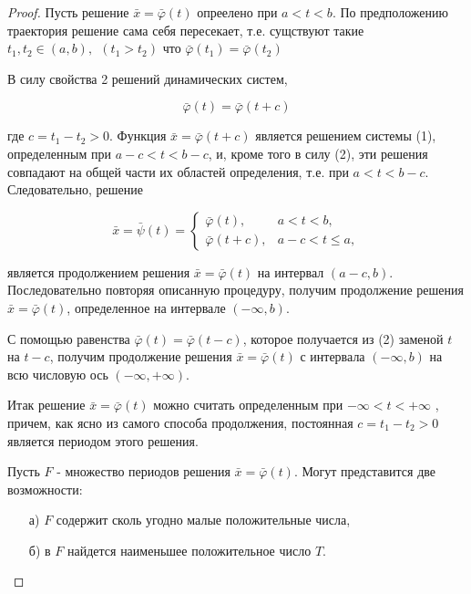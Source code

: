 \documentclass{article}
\theoremstyle{definition} \newtheorem*{theorem*}{Теорема}
\theoremstyle{plain} \newtheorem{theorem}{Теорема}[section]
\theoremstyle{definition} \newtheorem*{corollary*}{Следствие}
\theoremstyle{definition} \newtheorem{corollary}{Следствие}[section]
\begin{document}
\begin{proof}
    Пусть решение $\bar{x} = \bar{\varphi}(t)$ опреелено при $a < t < b$.
    По предположению траектория решение сама себя пересекает,
    т.е. сущствуют такие
    $t_1,t_2 \in (a,b) ,\ \ (t_1 > t_2)$ что
    $\bar{\varphi}(t_1) = \bar{\varphi}(t_2)$

    В силу свойства 2 решений динамических систем,

    \begin{equation}
        \bar{\varphi}(t) = \bar{\varphi}(t + c)
    \end{equation}

    где $c = t_1 - t_2 > 0$.
    Функция $\bar{x} = \bar{\varphi}(t+c)$ является решением системы (1),
    определенным при $a-c < t < b-c$, и, кроме того в силу (2),
    эти решения совпадают на общей части их областей определения,
    т.е. при $a < t < b-c$. Следовательно, решение

    \begin{equation}
        \bar{x} = \bar{\psi}(t) =
        \begin{cases}
            \bar{\varphi}(t), &a < t < b,\\
            \bar{\varphi}(t + c), & a-c < t \le a,
        \end{cases}
    \end{equation}

    является продолжением решения $\bar{x} = \bar{\varphi}(t)$
    на интервал $(a-c, b)$.
    Последовательно повторяя описанную процедуру,
    получим продолжение
    решения $\bar{x} = \bar{\varphi}(t)$, определенное
    на интервале $(- \infty, b)$.

    С помощью равенства $\bar{\varphi}(t)
    = \bar{\varphi}(t - c)$, которое
    получается из (2) заменой $t$ на $t - c$, получим продолжение
    решения $\bar{x} = \bar{\varphi}(t)$ с интервала
    $(- \infty, b)$ на всю числовую ось $(-\infty, +\infty)$.

    Итак решение $\bar{x} = \bar{\varphi}(t)$  можно считать
    определенным при $- \infty < t < + \infty$ , причем,
    как ясно из самого способа продолжения, постоянная
    $c = t_1 - t_2 > 0$ является периодом этого решения.

    Пусть $F$ - множество периодов решения
    $\bar{x} = \bar{\varphi}(t)$.
    Могут представится две возможности:

    \begin{itemize}
        \item[а)] $F$ содержит сколь угодно малые
            положительные числа,
        \item[б)] в $F$ найдется наименьшее положительное
            число $T$.
    \end{itemize}


\end{proof}
\end{document}
